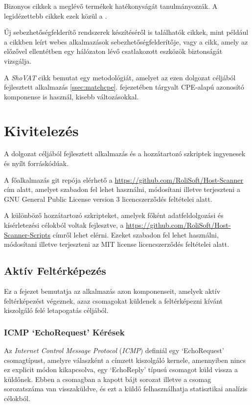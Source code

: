 	Bizonyos cikkek a meglévő termékek hatékonyságát tanulmányozzák. A legidézettebb cikkek ezek közül a \cite{holm11,bau10,doupe10}.
	
	Új sebezhetőségfelderítő rendszerek készítéséről is találhatók cikkek, mint például a \cite{kals06} cikkben leírt webes alkalmazások sebezhetőségfelderítője, vagy a \cite{guo05} cikk, amely az előzővel ellentétben egy hálózaton lévő csatlakozott eszközök biztonságát vizsgálja.
	
	A \textit{ShoVAT}\cite{shovat15} cikk bemutat egy metodológiát, amelyet az ezen dolgozat céljából fejlesztett alkalmazás \ref{ssec:matchcpe}. fejezetében tárgyalt CPE-alapú azonosító komponense is használ, kisebb változásokkal.

\section*{Kivitelezés} \label{sec:impl}

	A dolgozat céljából fejlesztett alkalmazás és a hozzátartozó szkriptek ingyenesek és nyílt forráskódúak.

	A főalkalmazás git repója elérhető a \url{https://github.com/RoliSoft/Host-Scanner} cím alatt, amelyet szabadon fel lehet használni, módosítani illetve terjeszteni a GNU General Public License version 3\cite{gplv3} licencszerződés feltételei alatt.
	
	A különböző hozzátartozó szkripteket, amelyek főként adatfeldolgozási és kísérletezési célokból voltak fejlesztve, a \url{https://github.com/RoliSoft/Host-Scanner-Scripts} címről lehet elérni. Ezeket szabadon fel lehet használni, módosítani illetve terjeszteni az MIT license\cite{mit} licencszerződés feltételei alatt.

\subsection*{Aktív Feltérképezés}

	Ez a fejezet bemutatja az alkalmazás azon komponenseit, amelyek aktív feltérképezést végeznek, azaz csomagokat küldenek a feltérképezni kívánt kiszolgáló felé letapogatás céljából.

\subsubsection*{ICMP `EchoRequest' Kérések} \label{ssec:icmpping}

	Az \textit{Internet Control Message Protocol} (\textit{ICMP}) definiál egy `EchoRequest' csomagtípust, amelyre válaszként a címzett kiszolgáló kernele, amennyiben nincs ez explicit módon kikapcsolva, egy `EchoReply' típusú csomagot küld vissza a küldőnek. Ebben a csomagban a kapott bájt sorozat illetve a csomag sorozatszáma van visszaküldve, és ezt a küldő felhasználhatja statisztikai analízis célokból.

